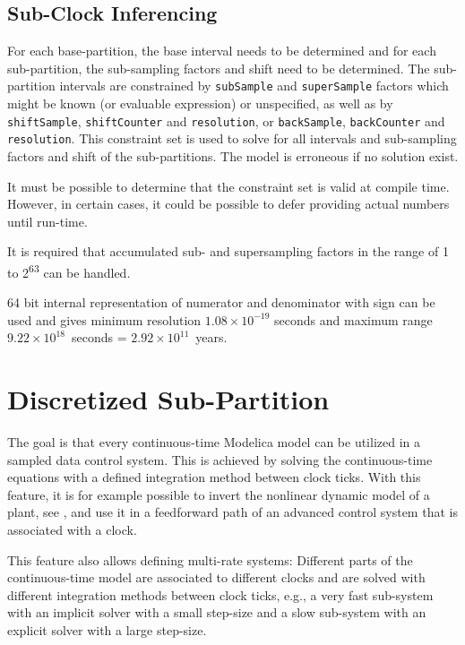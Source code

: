 \subsection{Sub-Clock Inferencing}\label{sub-clock-inferencing}

For each base-partition, the base interval needs to be determined and for each sub-partition, the sub-sampling factors and shift need to be determined.
The sub-partition intervals are constrained by \lstinline!subSample! and \lstinline!superSample! factors which might be known (or evaluable expression) or unspecified, as well as by \lstinline!shiftSample!, \lstinline!shiftCounter! and \lstinline!resolution!, or \lstinline!backSample!, \lstinline!backCounter! and \lstinline!resolution!.
This constraint set is used to solve for all intervals and sub-sampling factors and shift of the sub-partitions.
The model is erroneous if no solution exist.

\begin{nonnormative}
It must be possible to determine that the constraint set is valid at compile time.
However, in certain cases, it could be possible to defer providing actual numbers until run-time.
\end{nonnormative}

It is required that accumulated sub- and supersampling factors in the range of 1 to 2\textsuperscript{63} can be handled.

\begin{nonnormative}
64 bit internal representation of numerator and denominator with sign can be used and gives minimum resolution $1.08\times 10^{-19}$ seconds and maximum range $9.22\times 10^{18}$~seconds = $2.92\times 10^{11}$~years.
\end{nonnormative}

\section{Discretized Sub-Partition}\label{continuous-time-equations-in-clocked-partitions}\label{discretized-partition}

\begin{nonnormative}
The goal is that every continuous-time Modelica model can be utilized in a sampled data control system.
This is achieved by solving the continuous-time equations with a defined integration method between clock ticks.
With this feature, it is for example possible to invert the nonlinear dynamic model of a plant, see \textcite{ThummelEtAl2005InverseModels}, and use it in a feedforward path of an advanced control system that is associated with a clock.

This feature also allows defining multi-rate systems: Different parts of the continuous-time model are associated to different clocks and are solved with different integration methods between clock ticks, e.g., a very fast sub-system with an implicit solver with a small step-size and a slow sub-system with an explicit solver with a large step-size.
\end{nonnormative}

